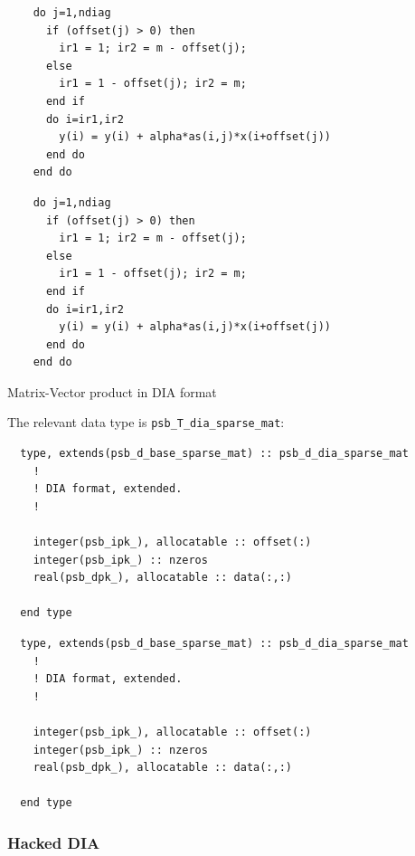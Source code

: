 \begin{algorithm}
\ifpdf
\begin{verbatim}
    do j=1,ndiag
      if (offset(j) > 0) then 
        ir1 = 1; ir2 = m - offset(j);
      else
        ir1 = 1 - offset(j); ir2 = m;
      end if
      do i=ir1,ir2
        y(i) = y(i) + alpha*as(i,j)*x(i+offset(j))
      end do
    end do
\end{verbatim}
\else
\begin{center}
    \begin{minipage}[tl]{0.9\textwidth}
\begin{verbatim} 
    do j=1,ndiag
      if (offset(j) > 0) then 
        ir1 = 1; ir2 = m - offset(j);
      else
        ir1 = 1 - offset(j); ir2 = m;
      end if
      do i=ir1,ir2
        y(i) = y(i) + alpha*as(i,j)*x(i+offset(j))
      end do
    end do
\end{verbatim}
    \end{minipage}
  \end{center}
\fi
  \caption{\label{alg:dia} Matrix-Vector product in DIA format}
\end{algorithm}


The relevant data type is \verb|psb_T_dia_sparse_mat|:
\ifpdf
\begin{verbatim}
  type, extends(psb_d_base_sparse_mat) :: psb_d_dia_sparse_mat
    !
    ! DIA format, extended.
    !     
    
    integer(psb_ipk_), allocatable :: offset(:)
    integer(psb_ipk_) :: nzeros
    real(psb_dpk_), allocatable :: data(:,:)

  end type
\end{verbatim}
\else
\begin{center}
    \begin{minipage}[tl]{0.9\textwidth}
\begin{verbatim} 
  type, extends(psb_d_base_sparse_mat) :: psb_d_dia_sparse_mat
    !
    ! DIA format, extended.
    !     
    
    integer(psb_ipk_), allocatable :: offset(:)
    integer(psb_ipk_) :: nzeros
    real(psb_dpk_), allocatable :: data(:,:)

  end type
\end{verbatim}
    \end{minipage}
  \end{center}
\fi



\subsubsection*{Hacked DIA}

